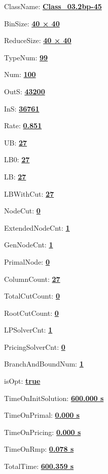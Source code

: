 \documentclass[11pt]{article}
\begin{document}
\pagestyle{empty}


ClassName: \underline{\textbf{Class_03.2bp-45}}
\par
BinSize: \underline{\textbf{40 × 40}}
\par
ReduceSize: \underline{\textbf{40 × 40}}
\par
TypeNum: \underline{\textbf{99}}
\par
Num: \underline{\textbf{100}}
\par
OutS: \underline{\textbf{43200}}
\par
InS: \underline{\textbf{36761}}
\par
Rate: \underline{\textbf{0.851}}
\par
UB: \underline{\textbf{27}}
\par
LB0: \underline{\textbf{27}}
\par
LB: \underline{\textbf{27}}
\par
LBWithCut: \underline{\textbf{27}}
\par
NodeCut: \underline{\textbf{0}}
\par
ExtendedNodeCnt: \underline{\textbf{1}}
\par
GenNodeCnt: \underline{\textbf{1}}
\par
PrimalNode: \underline{\textbf{0}}
\par
ColumnCount: \underline{\textbf{27}}
\par
TotalCutCount: \underline{\textbf{0}}
\par
RootCutCount: \underline{\textbf{0}}
\par
LPSolverCnt: \underline{\textbf{1}}
\par
PricingSolverCnt: \underline{\textbf{0}}
\par
BranchAndBoundNum: \underline{\textbf{1}}
\par
isOpt: \underline{\textbf{true}}
\par
TimeOnInitSolution: \underline{\textbf{600.000 s}}
\par
TimeOnPrimal: \underline{\textbf{0.000 s}}
\par
TimeOnPricing: \underline{\textbf{0.000 s}}
\par
TimeOnRmp: \underline{\textbf{0.078 s}}
\par
TotalTime: \underline{\textbf{600.359 s}}
\par
\newpage


\end{document}
